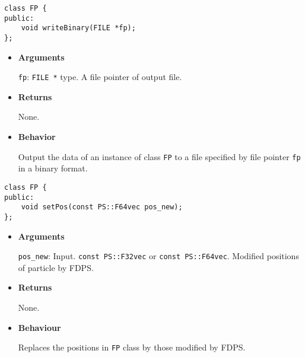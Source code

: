 \label{sec:FP_writeBinary}

\begin{screen}
\begin{verbatim}
class FP {
public:
    void writeBinary(FILE *fp);
};
\end{verbatim}
\end{screen}

\begin{itemize}

\item {\bf Arguments}

  \texttt{fp}: \texttt{FILE *} type. A file pointer of output file.
  
\item {\bf Returns}

  None.
  
\item {\bf Behavior}


  Output the data of an instance of class \texttt{FP} to a file specified by file pointer \texttt{fp} in a binary format. 
  
\end{itemize}




\begin{screen}
\begin{verbatim}
class FP {
public:
    void setPos(const PS::F64vec pos_new);
};
\end{verbatim}
\end{screen}

\begin{itemize}

\item {\bf Arguments}

  \texttt{pos\_new}: Input. \texttt{const PS::F32vec} or \texttt{const PS::F64vec}. Modified positions of particle by FDPS.

\item {\bf Returns}

  None.
  
\item {\bf Behaviour}

  Replaces the positions in \texttt{FP} class by those modified by FDPS.

\end{itemize}

